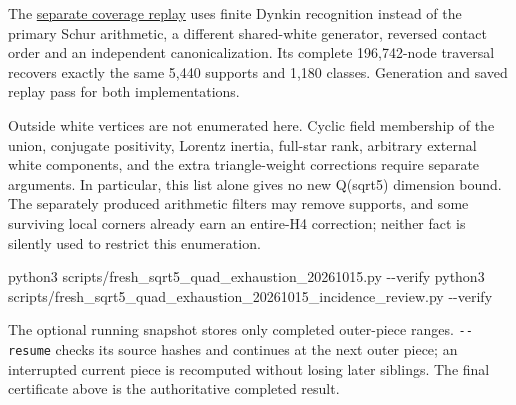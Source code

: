 \documentclass[
  10pt,
]{report}
\newenvironment{Shaded}{}{}
\newcommand{\AttributeTok}[1]{\textcolor[rgb]{0.49,0.56,0.16}{#1}}
\newcommand{\ExtensionTok}[1]{#1}
\newcommand{\NormalTok}[1]{#1}
\begin{document}
The
\href{fresh_sqrt5_quad_exhaustion_20261015_incidence_review.md}{separate
coverage replay} uses finite Dynkin recognition instead of the primary
Schur arithmetic, a different shared-white generator, reversed contact
order and an independent canonicalization. Its complete 196,742-node
traversal recovers exactly the same 5,440 supports and 1,180 classes.
Generation and saved replay pass for both implementations.

Outside white vertices are not enumerated here. Cyclic field membership
of the union, conjugate positivity, Lorentz inertia, full-star rank,
arbitrary external white components, and the extra triangle-weight
corrections require separate arguments. In particular, this list alone
gives no new Q(sqrt5) dimension bound. The separately produced
arithmetic filters may remove supports, and some surviving local corners
already earn an entire-H4 correction; neither fact is silently used to
restrict this enumeration.

\begin{Shaded}
\begin{Highlighting}[]
\ExtensionTok{python3}\NormalTok{ scripts/fresh\_sqrt5\_quad\_exhaustion\_20261015.py }\AttributeTok{{-}{-}verify}
\ExtensionTok{python3}\NormalTok{ scripts/fresh\_sqrt5\_quad\_exhaustion\_20261015\_incidence\_review.py }\AttributeTok{{-}{-}verify}
\end{Highlighting}
\end{Shaded}

The optional running snapshot stores only completed outer-piece ranges.
\texttt{-\/-resume} checks its source hashes and continues at the next
outer piece; an interrupted current piece is recomputed without losing
later siblings. The final certificate above is the authoritative
completed result.
\end{document}
